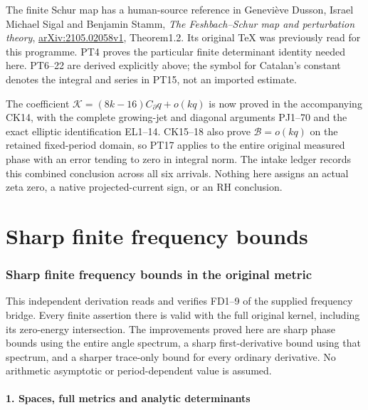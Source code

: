 \documentclass[10pt]{article}
\begin{document}
The finite Schur map has a human-source reference in Geneviève Dusson, Israel Michael Sigal and Benjamin Stamm, \emph{The Feshbach--Schur map and perturbation theory}, \href{https://arxiv.org/abs/2105.02058v1}{arXiv:2105.02058v1}, Theorem1.2. Its original TeX was previously read for this programme. PT4 proves the particular finite determinant identity needed here. PT6--22 are derived explicitly above; the symbol for Catalan's constant denotes the integral and series in PT15, not an imported estimate.

The coefficient \(\mathcal K=(8k-16)C_\partial q+o(kq)\) is now proved in the accompanying CK14, with the complete growing-jet and diagonal arguments PJ1--70 and the exact elliptic identification EL1--14. CK15--18 also prove \(\mathcal B=o(kq)\) on the retained fixed-period domain, so PT17 applies to the entire original measured phase with an error tending to zero in integral norm. The intake ledger records this combined conclusion across all six arrivals. Nothing here assigns an actual zeta zero, a native projected-current sign, or an RH conclusion.

\clearpage\part{Sharp finite frequency bounds}
\section{Sharp finite frequency bounds in the original metric}\label{sharp-finite-frequency-bounds-in-the-original-metric}

This independent derivation reads and verifies FD1--9 of the supplied frequency bridge. Every finite assertion there is valid with the full original kernel, including its zero-energy intersection. The improvements proved here are sharp phase bounds using the entire angle spectrum, a sharp first-derivative bound using that spectrum, and a sharper trace-only bound for every ordinary derivative. No arithmetic asymptotic or period-dependent value is assumed.

\subsection{1. Spaces, full metrics and analytic determinants}\label{spaces-full-metrics-and-analytic-determinants}
\end{document}
